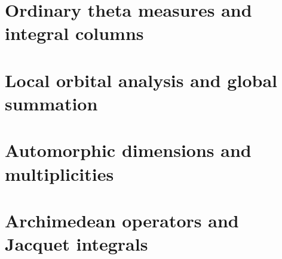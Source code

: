 \part{Ordinary theta measures and integral columns}














\part{Local orbital analysis and global summation}











\part{Automorphic dimensions and multiplicities}








\part{Archimedean operators and Jacquet integrals}





















